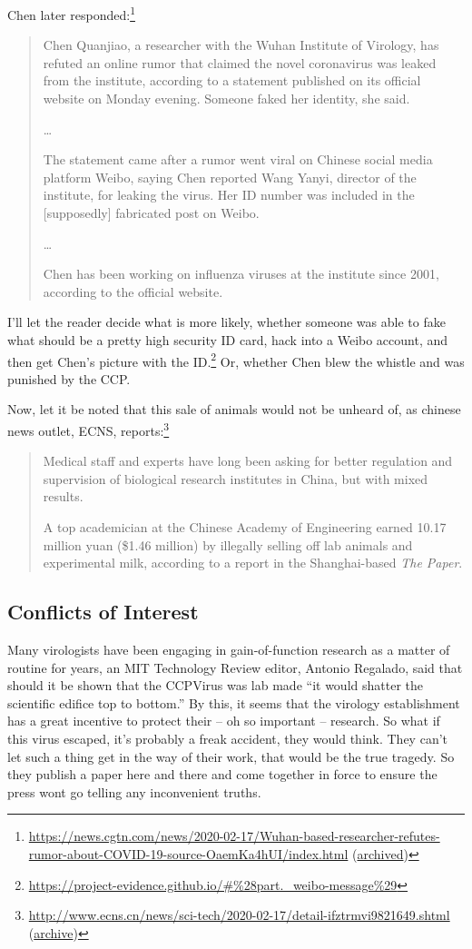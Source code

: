 \documentclass[11pt]{article}
\begin{document}
Chen later responded:\footnote{\url{https://news.cgtn.com/news/2020-02-17/Wuhan-based-researcher-refutes-rumor-about-COVID-19-source-OaemKa4hUI/index.html} (\href{https://archive.is/1prJP}{archived})}
\begin{quote}
Chen Quanjiao, a researcher with the Wuhan Institute of Virology, has refuted an online rumor that claimed the novel coronavirus was leaked from the institute, according to a statement published on its official website on Monday evening. Someone faked her identity, she said.

\ldots{}

The statement came after a rumor went viral on Chinese social media platform Weibo, saying Chen reported Wang Yanyi, director of the institute, for leaking the virus. Her ID number was included in the [supposedly] fabricated post on Weibo.

\ldots{}

Chen has been working on influenza viruses at the institute since 2001, according to the official website.
\end{quote}

I'll let the reader decide what is more likely, whether someone was able to fake what should be a pretty high security ID card, hack into a Weibo account, and then get Chen's picture with the ID.\footnote{\url{https://project-evidence.github.io/\#\%28part.\_weibo-message\%29}} Or, whether Chen blew the whistle and was punished by the CCP.

Now, let it be noted that this sale of animals would not be unheard of, as chinese news outlet, ECNS, reports:\footnote{\url{http://www.ecns.cn/news/sci-tech/2020-02-17/detail-ifztrmvi9821649.shtml} (\href{https://archive.is/w2d3o}{archive})}
\begin{quote}
Medical staff and experts have long been asking for better regulation and supervision of biological research institutes in China, but with mixed results.

A top academician at the Chinese Academy of Engineering earned 10.17 million yuan (\$1.46 million) by illegally selling off lab animals and experimental milk, according to a report in the Shanghai-based \emph{The Paper}.
\end{quote}

\subsection{Conflicts of Interest}
\label{sec:orgf1a4bbb}
Many virologists have been engaging in gain-of-function research as a matter of routine for years, an MIT Technology Review editor, Antonio Regalado, said that should it be shown that the CCPVirus was lab made ``it would shatter the scientific edifice top to bottom.'' By this, it seems that the virology establishment has a great incentive to protect their -- oh so important -- research. So what if this virus escaped, it's probably a freak accident, they would think. They can't let such a thing get in the way of their work, that would be the true tragedy. So they publish a paper here and there and come together in force to ensure the press wont go telling any inconvenient truths.
\end{document}
